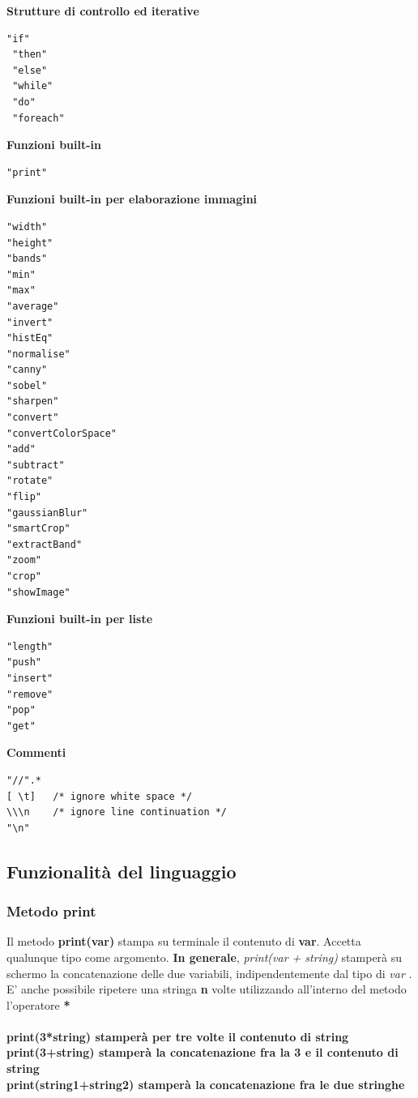 \documentclass[10pt]{article}
\begin{document}
\textbf{Strutture di controllo ed iterative}
\begin{lstlisting}[breaklines=true, postbreak=\mbox{{$\hookrightarrow$}\space}]
 "if"   
 "then"  
 "else" 
 "while" 
 "do"    
 "foreach" 
\end{lstlisting}

\textbf{Funzioni built-in}
\begin{lstlisting}[breaklines=true, postbreak=\mbox{{$\hookrightarrow$}\space}]
"print"     
\end{lstlisting}

\textbf{Funzioni built-in per elaborazione immagini}
\begin{lstlisting}[breaklines=true, postbreak=\mbox{{$\hookrightarrow$}\space}]
"width"             
"height"            
"bands"             
"min"               
"max"               
"average"           
"invert"            
"histEq"            
"normalise"         
"canny"             
"sobel"             
"sharpen"          
"convert"           
"convertColorSpace" 
"add"               
"subtract"        
"rotate"           
"flip"          
"gaussianBlur"    
"smartCrop"        
"extractBand"
"zoom"             
"crop"             
"showImage"               
\end{lstlisting}


\textbf{Funzioni built-in per liste}
\begin{lstlisting}[breaklines=true, postbreak=\mbox{{$\hookrightarrow$}\space}]
"length"           
"push"             
"insert"           
"remove"            
"pop"               
"get"               
\end{lstlisting}

\textbf{Commenti}
\begin{lstlisting}[breaklines=true, postbreak=\mbox{{$\hookrightarrow$}\space}]
"//".*  
[ \t]   /* ignore white space */ 
\\\n    /* ignore line continuation */
"\n"  
\end{lstlisting}

\subsection{Funzionalità del linguaggio}
\subsubsection{Metodo print}
Il metodo \textbf{print(var)} stampa su terminale il contenuto di \textbf{var}. Accetta qualunque tipo come argomento. 
\textbf{In generale}, \textit{print(var + string)} stamperà su schermo la concatenazione delle due variabili, indipendentemente dal tipo di \textit{var} .\\ 
E' anche possibile ripetere una stringa \textbf{n} volte utilizzando all'interno del metodo l'operatore \textbf{*}\\\\
\textbf{print(3*string) stamperà per tre volte il contenuto di string}\\
\textbf{print(3+string) stamperà la concatenazione fra la 3 e il contenuto di string}\\
\textbf{print(string1+string2) stamperà la concatenazione fra le due stringhe}\\
\end{document}
